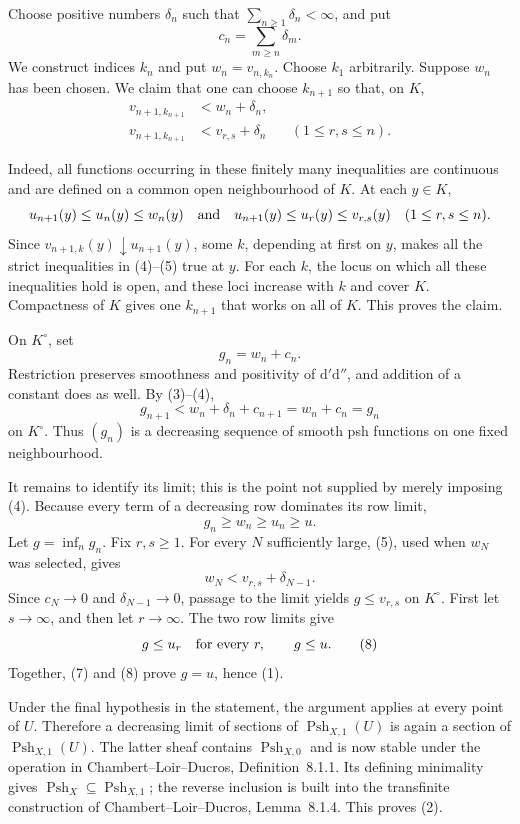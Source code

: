 
Choose positive numbers \(\delta_n\) such that
\(\sum_{n\geq1}\delta_n<\infty\), and put
\[
                         c_n=\sum_{m\geq n}\delta_m.
                         \tag{3}
\]
We construct indices \(k_n\) and put \(w_n=v_{n,k_n}\).  Choose \(k_1\)
arbitrarily.  Suppose \(w_n\) has been chosen.  We claim that one can choose
\(k_{n+1}\) so that, on \(K\),
\begin{align}
 v_{n+1,k_{n+1}}&<w_n+\delta_n,                         \tag{4}\\
 v_{n+1,k_{n+1}}&<v_{r,s}+\delta_n
                    &&(1\leq r,s\leq n).                \tag{5}
\end{align}

Indeed, all functions occurring in these finitely many inequalities are
continuous and are defined on a common open neighbourhood of \(K\).  At
each \(y\in K\),
\[
 u_{n+1}(y)\leq u_n(y)\leq w_n(y)
 \quad\hbox{and}\quad
 u_{n+1}(y)\leq u_r(y)\leq v_{r,s}(y)\quad(1\leq r,s\leq n).
\]
Since \(v_{n+1,k}(y)\downarrow u_{n+1}(y)\), some \(k\), depending at first
on \(y\), makes all the strict inequalities in (4)--(5) true at \(y\).
For each \(k\), the locus on which all these inequalities hold is open, and
these loci increase with \(k\) and cover \(K\).  Compactness of \(K\) gives
one \(k_{n+1}\) that works on all of \(K\).  This proves the claim.

On \(K^\circ\), set
\[
                              g_n=w_n+c_n.               \tag{6}
\]
Restriction preserves smoothness and positivity of
\(\mathrm d'\mathrm d''\), and addition of a constant does as well.  By
(3)--(4),
\[
 g_{n+1}<w_n+\delta_n+c_{n+1}=w_n+c_n=g_n
\]
on \(K^\circ\).  Thus \((g_n)\) is a decreasing sequence of smooth psh
functions on one fixed neighbourhood.

It remains to identify its limit; this is the point not supplied by merely
imposing (4).  Because every term of a decreasing row dominates its row
limit,
\[
                       g_n\geq w_n\geq u_n\geq u.        \tag{7}
\]
Let \(g=\inf_n g_n\).  Fix \(r,s\geq1\).  For every \(N\) sufficiently
large, (5), used when \(w_N\) was selected, gives
\[
                      w_N<v_{r,s}+\delta_{N-1}.
\]
Since \(c_N\to0\) and \(\delta_{N-1}\to0\), passage to the limit yields
\(g\leq v_{r,s}\) on \(K^\circ\).  First let \(s\to\infty\), and then let
\(r\to\infty\).  The two row limits give
\[
                         g\leq u_r\quad\hbox{for every }r,
                         \qquad g\leq u.                 \tag{8}
\]
Together, (7) and (8) prove \(g=u\), hence (1).

Under the final hypothesis in the statement, the argument applies at every
point of \(U\).  Therefore a decreasing limit of sections of
\(\operatorname{Psh}_{X,1}(U)\) is again a section of
\(\operatorname{Psh}_{X,1}(U)\).  The latter sheaf contains
\(\operatorname{Psh}_{X,0}\) and is now stable under the operation in
Chambert--Loir--Ducros, Definition~8.1.1.  Its defining minimality gives
\(\operatorname{Psh}_X\subseteq\operatorname{Psh}_{X,1}\); the reverse
inclusion is built into the transfinite construction of
Chambert--Loir--Ducros, Lemma~8.1.4.  This proves (2).

